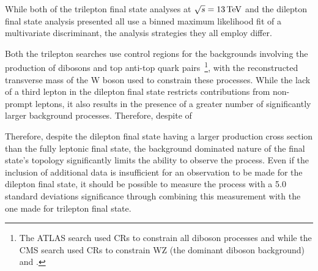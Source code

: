 While both of the trilepton final state analyses at $\sqrt{s} = 13 \,\text{Te\hspace{-.08em}V}$ and the dilepton final state analysis presented all use a binned maximum likelihood fit of a multivariate discriminant, the analysis strategies they all employ differ.

Both the trilepton searches use control regions for the backgrounds involving the production of dibosons and top anti-top  quark pairs~\footnote{The ATLAS search used CRs to constrain all diboson processes and \ttbar while the CMS search used CRs to constrain WZ (the dominant diboson background) and \ttbarZ.}, with the reconstructed transverse mass of the W boson used to constrain these processes.
While the lack of a third lepton in the dilepton final state restricts contributions from non-prompt leptons, it also results in the presence of a greater number of significantly larger background processes.
Therefore, despite of 


Therefore, despite the dilepton final state having a larger production cross section than the fully leptonic final state, the background dominated nature of the final state's topology significantly limits the ability to observe the process.
Even if the inclusion of additional data is insufficient for an observation to be made for the dilepton final state, it should be possible to measure the process with a 5.0 standard deviations significance through combining this measurement with the one made for trilepton final state.
